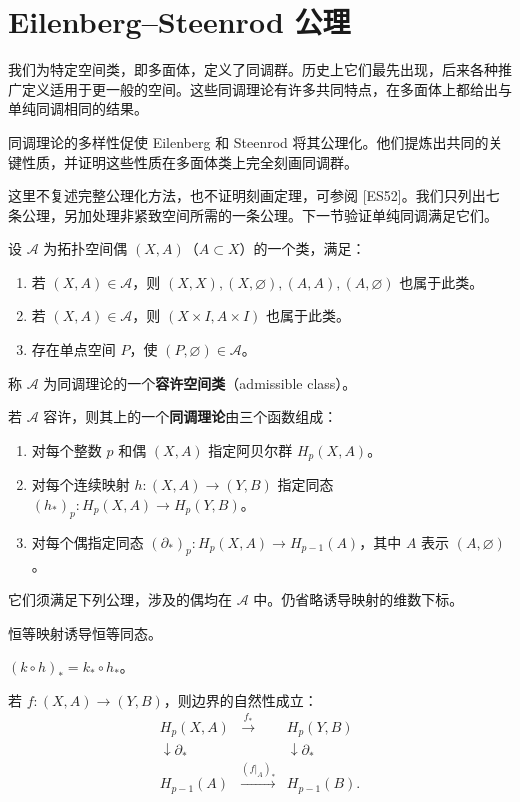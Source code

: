 \section{Eilenberg--Steenrod 公理}
我们为特定空间类，即多面体，定义了同调群。历史上它们最先出现，后来各种推广定义适用于更一般的空间。这些同调理论有许多共同特点，在多面体上都给出与单纯同调相同的结果。

同调理论的多样性促使 Eilenberg 和 Steenrod 将其公理化。他们提炼出共同的关键性质，并证明这些性质在多面体类上完全刻画同调群。

这里不复述完整公理化方法，也不证明刻画定理，可参阅 [ES52]。我们只列出七条公理，另加处理非紧致空间所需的一条公理。下一节验证单纯同调满足它们。

设 $\mathcal A$ 为拓扑空间偶 $(X,A)$（$A\subset X$）的一个类，满足：
\begin{enumerate}[label=(\arabic*)]
\item 若 $(X,A)\in\mathcal A$，则 $(X,X),(X,\varnothing),(A,A),(A,\varnothing)$ 也属于此类。
\item 若 $(X,A)\in\mathcal A$，则 $(X\times I,A\times I)$ 也属于此类。
\item 存在单点空间 $P$，使 $(P,\varnothing)\in\mathcal A$。
\end{enumerate}
称 $\mathcal A$ 为同调理论的一个\textbf{容许空间类}（admissible class）。

若 $\mathcal A$ 容许，则其上的一个\textbf{同调理论}由三个函数组成：
\begin{enumerate}[label=(\arabic*)]
\item 对每个整数 $p$ 和偶 $(X,A)$ 指定阿贝尔群 $H_p(X,A)$。
\item 对每个连续映射 $h:(X,A)\to(Y,B)$ 指定同态 $(h_*)_p:H_p(X,A)\to H_p(Y,B)$。
\item 对每个偶指定同态 $(\partial_*)_p:H_p(X,A)\to H_{p-1}(A)$，其中 $A$ 表示 $(A,\varnothing)$。
\end{enumerate}
它们须满足下列公理，涉及的偶均在 $\mathcal A$ 中。仍省略诱导映射的维数下标。

恒等映射诱导恒等同态。

$(k\circ h)_*=k_*\circ h_*$。

若 $f:(X,A)\to(Y,B)$，则边界的自然性成立：
\[
\begin{array}{ccc}
H_p(X,A)&\xrightarrow{f_*}&H_p(Y,B)\\
\downarrow\scriptstyle\partial_*&&\downarrow\scriptstyle\partial_*\\
H_{p-1}(A)&\xrightarrow{(f|_A)_*}&H_{p-1}(B).
\end{array}
\]

